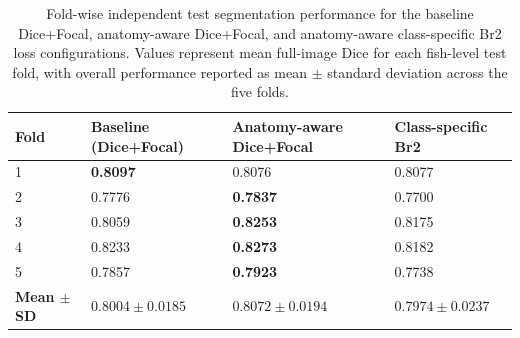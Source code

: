 \begin{table}[htbp]
\centering
\caption{Fold-wise independent test segmentation performance for the baseline Dice+Focal, anatomy-aware Dice+Focal, and anatomy-aware class-specific Br2 loss configurations. Values represent mean full-image Dice for each fish-level test fold, with overall performance reported as mean $\pm$ standard deviation across the five folds.}
\label{tab:overall_performance}

\begin{tabularx}{\textwidth}{lXXX}
\toprule
\textbf{Fold} &
\textbf{Baseline (Dice+Focal)} &
\textbf{Anatomy-aware Dice+Focal} &
\textbf{Class-specific Br2} \\
\midrule
1 & \textbf{0.8097} & 0.8076 & 0.8077 \\
2 & 0.7776 & \textbf{0.7837} & 0.7700 \\
3 & 0.8059 & \textbf{0.8253} & 0.8175 \\
4 & 0.8233 & \textbf{0.8273} & 0.8182 \\
5 & 0.7857 & \textbf{0.7923} & 0.7738 \\
\midrule
\textbf{Mean $\pm$ SD} & $0.8004 \pm 0.0185$ & \textbf{$0.8072 \pm 0.0194$} & $0.7974 \pm 0.0237$ \\
\bottomrule
\end{tabularx}
\end{table}

